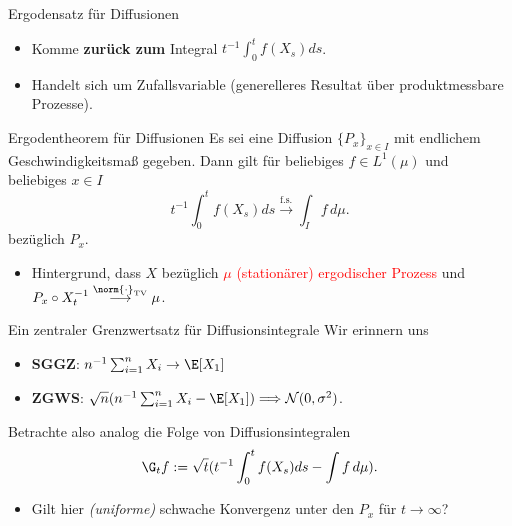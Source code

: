 \begin{frame}{Ergodensatz für Diffusionen}
\begin{itemize}
    \item Komme \textbf{zurück zum} Integral $ t^{-1}\int_0^t f(X_s) ds$.
    \item Handelt sich um Zufallsvariable (generelleres Resultat über produktmessbare Prozesse).
\end{itemize}
  
    \begin{theoremblockname}{Ergodentheorem für Diffusionen}
    Es sei eine Diffusion $\{P_x\}_{x \in I}$ mit endlichem Geschwindigkeitsmaß gegeben. Dann gilt für beliebiges $f \in L^1(\mu)$ und beliebiges $x \in I$ \[
    t^{-1}\int_0^t f(X_s) ds \overset{\text{f.s.}}{\to} \int_I f\,d\mu.
    \] bezüglich $P_x$.
    \end{theoremblockname}
    \pause
\begin{itemize}
    \item Hintergrund, dass $X$ bezüglich \textcolor{red}{$\mu$ (stationärer) ergodischer Prozess} und $P_x \circ X_t^{-1} \overset{\norm{\cdot}_\text{TV}}{\longrightarrow} \mu$.
\end{itemize}
\end{frame}
\begin{frame}{Ein zentraler Grenzwertsatz für Diffusionsintegrale}
Wir erinnern uns
\begin{itemize}
    \item \textbf{SGGZ}: $n^{-1}\sum_{i=1}^n X_i \to \E[X_1]$
    \item  \textbf{ZGWS}: $\sqrt{n}(n^{-1}\sum_{i=1}^n X_i - \E[X_1]) \Longrightarrow \mathcal{N}(0, \sigma^2)$.
\end{itemize}
\pause
    Betrachte also analog die Folge von Diffusionsintegralen \[\G_t f := \sqrt{t}(t^{-1}\int_0^t f(X_s) ds - \int f \, d\mu). \]
    \begin{itemize}
        \item Gilt hier \textit{(uniforme)} schwache Konvergenz unter den $P_x$ für $t \to \infty$?
    \end{itemize}
\end{frame}

